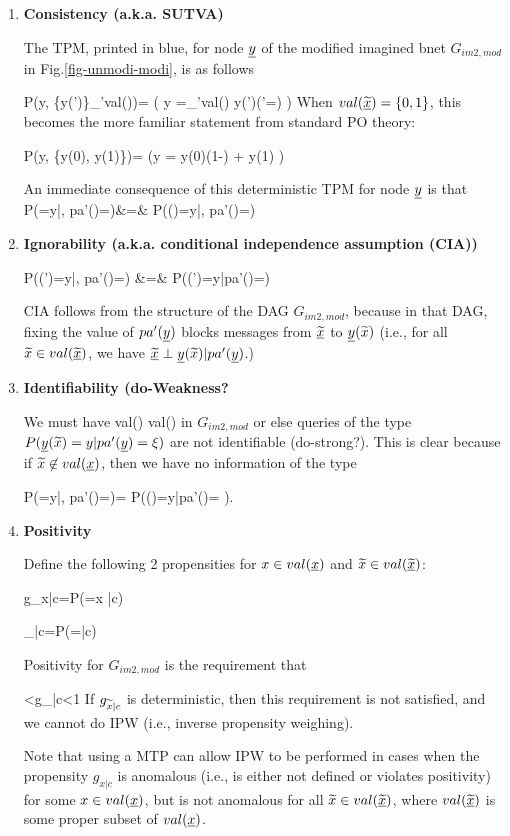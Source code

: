 \begin{enumerate}


\item {\bf Consistency (a.k.a. SUTVA)}

The TPM, printed in  blue, for node $\rvy$
of the modified imagined bnet $G_{im2,mod}$ in Fig.\ref{fig-unmodi-modi},
 is as follows

\beq \color{blue}
P(y\mid \tilx, \{y(\tilx')\}_{\tilx'\in val(\ul{\tilx})})=
\indi(
\quad y =\sum_{\tilx'\in val(\ul{\tilx})}
 y(\tilx')\indi(\tilx'=\tilx)
 \quad)
\eeq
When $val(\ul{\tilx})=\bool$,
this becomes the more familiar 
statement from standard 
PO theory:

\beq \color{blue}
P(y\mid \tilx, \{y(0), y(1)\})=
\indi(\quad y =
y(0)(1-\tilx)
+ 
y(1)\tilx
\quad)
\eeq

An immediate consequence
of this deterministic TPM for
node $\rvy$ is that
\beqa
P(\rvy=y|\tilx, pa'(\rvy)=\xi)&=&
P(\rvy(\tilx)=y|\tilx, pa'(\rvy)=\xi)
\eeqa


\item {\bf Ignorability (a.k.a.
conditional independence assumption (CIA))}

\beqa
P(\rvy(\tilx')=y|\tilx, pa'(\rvy)=\xi)
&=&
P(\rvy(\tilx')=y|pa'(\rvy)=\xi)
\eeqa

CIA follows from the structure
of the DAG $G_{im2,mod}$,
because in that
DAG, fixing the value
of $pa'(\rvy)$
blocks messages from $\ul{\tilx}$
to $\rvy(\tilx)$ (i.e.,
for all $\tilx\in val(\ul{\tilx})$,
we have  
$\ul{\tilx}
\perp \rvy(\tilx)|pa'(\rvy)$.)

\item {\bf Identifiability (do-Weakness?}

We must have
\beq
val(\ul{\tilx}) \subset val(\rvx)
\eeq
in $G_{im2, mod}$
or else queries of the type
 $P(\rvy(\tilx)=y|pa'(\rvy)=\xi)$ are not identifiable
 (do-strong?).
This is clear because if $\tilx\not\in val(\rvx)$,
then we have no information of the type

\beq
P(\rvy=y|\tilx, pa'(\rvy)=\xi)=
\quad P(\rvy(\tilx)=y|pa'(\rvy)=\xi
)\;.
\eeq

\item{\bf Positivity}

Define the following 2 propensities
for $x\in val(\rvx)$ and $\tilx \in val(\ul{\tilx})$:

\beq
g_{x|c}=P(\rvx=x |c)
\eeq

\beq
\tilg_{\tilx|c}=P(\ul{\tilx}=\tilx |c)
\eeq

Positivity for  $G_{im2,mod}$
is the requirement that

<g_{\tilx|c}<1 
\eeq
If $g_{{{\widetilde{x}}}|c}$
is deterministic, then this requirement
is not satisfied, and we cannot do IPW (i.e.,
inverse propensity weighing).

Note that using a MTP can allow IPW to
be performed  in cases
when the propensity $g_{x|c}$
is anomalous
(i.e., is
either not defined
or violates positivity)
for some $x\in val(\rvx)$, but is not anomalous
for all $\tilx\in val(\ul{\tilx})$, where
$val(\ul{\tilx})$
is some proper subset of $val(\rvx)$.

\end{enumerate}

